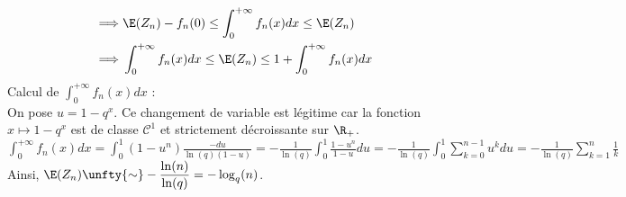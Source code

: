 \documentclass[8pt]{book}
\begin{document}
\begin{enumerate}
\begin{align*}
			\implies &\E(Z_n)-f_n(0)\leq \int_0^{+\infty}f_n(x)dx\leq \E(Z_n)\\
			\implies &\int_0^{+\infty}f_n(x)dx\leq \E(Z_n)\leq 1+\int_0^{+\infty}f_n(x)dx
		\end{align*}
		Calcul de $\displaystyle\int_0^{+\infty}f_n(x)dx$ :\\
		On pose $u=1-q^x$. Ce changement de variable est légitime car la fonction $x\mapsto 1-q^x$ est de classe $\mathcal{C}^1$ et strictement décroissante sur $\R_+$.\\
		$\displaystyle\int_0^{+\infty}f_n(x)dx=\int_0^1(1-u^n)\frac{-du}{\ln(q)(1-u)}=-\frac{1}{\ln(q)}\int_0^1\frac{1-u^n}{1-u}du=-\frac{1}{\ln(q)}\int_0^1\sum\limits_{k=0}^{n-1}u^kdu=-\frac{1}{\ln(q)}\sum\limits_{k=1}^n\frac{1}{k}$
		Ainsi, $\E(Z_n)\unfty{\sim}-\displaystyle\frac{\ln(n)}{\ln(q)}=-\log_q(n)$.
	\end{enumerate}
	
\end{document}
